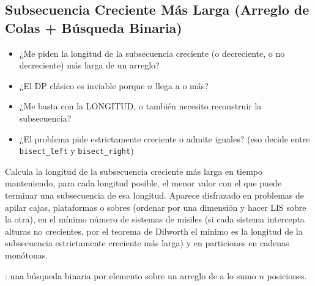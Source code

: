 \subsection{Subsecuencia Creciente Más Larga (Arreglo de Colas + Búsqueda Binaria)}
\label{alg:6-3}


\begin{itemize}
\item ¿Me piden la longitud de la subsecuencia creciente (o decreciente, o no decreciente) más larga de un arreglo?
\item ¿El DP clásico  es inviable porque $n$ llega a  o más?
\item ¿Me basta con la LONGITUD, o también necesito reconstruir la subsecuencia?
\item ¿El problema pide estrictamente creciente o admite iguales? (eso decide entre \texttt{bisect\_left} y \texttt{bisect\_right})
\end{itemize}

 Calcula la longitud de la subsecuencia creciente más larga en tiempo  manteniendo, para cada longitud posible, el menor valor con el que puede terminar una subsecuencia de esa longitud. Aparece disfrazado en problemas de apilar cajas, plataformas o sobres (ordenar por una dimensión y hacer LIS sobre la otra), en el mínimo número de sistemas de misiles (si cada sistema intercepta alturas no crecientes, por el teorema de Dilworth el mínimo es la longitud de la subsecuencia estrictamente creciente más larga) y en particiones en cadenas monótonas.

 : una búsqueda binaria por elemento sobre un arreglo de a lo sumo $n$ posiciones.


